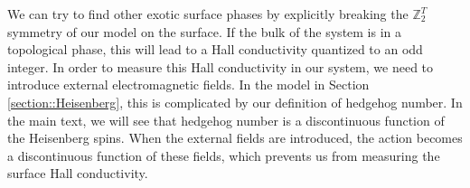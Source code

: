 \documentclass[prb,twocolumn]{revtex4-1}
\def\ztwo{\mathbb{Z}_2}
\def\ztwot{\mathbb{Z}_2^T}
\begin{document}
We can try to find other exotic surface phases by explicitly breaking the $\ztwot$ symmetry of our model on the surface. If the bulk of the system is in a topological phase, this will lead to a Hall conductivity quantized to an odd integer. In order to measure this Hall conductivity in our system, we need to introduce external electromagnetic fields. In the model in Section \ref{section::Heisenberg}, this is complicated by our definition of hedgehog number. In the main text, we will see that hedgehog number is a discontinuous function of the Heisenberg spins. When the external fields are introduced, the action becomes a discontinuous function of these fields, which prevents us from measuring the surface Hall conductivity.

\end{document}
